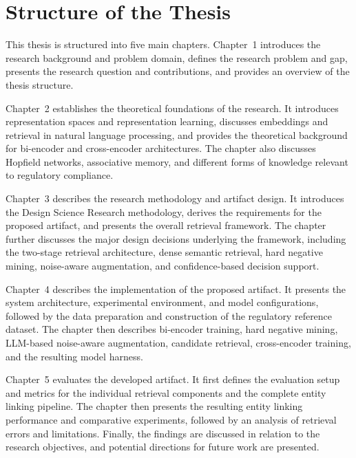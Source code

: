 \section{Structure of the Thesis}

This thesis is structured into five main chapters. Chapter~1 introduces the research background and problem domain, defines the research problem and gap, presents the research question and contributions, and provides an overview of the thesis structure.

Chapter~2 establishes the theoretical foundations of the research. It introduces representation spaces and representation learning, discusses embeddings and retrieval in natural language processing, and provides the theoretical background for bi-encoder and cross-encoder architectures. The chapter also discusses Hopfield networks, associative memory, and different forms of knowledge relevant to regulatory compliance.

Chapter~3 describes the research methodology and artifact design. It introduces the Design Science Research methodology, derives the requirements for the proposed artifact, and presents the overall retrieval framework. The chapter further discusses the major design decisions underlying the framework, including the two-stage retrieval architecture, dense semantic retrieval, hard negative mining, noise-aware augmentation, and confidence-based decision support.

Chapter~4 describes the implementation of the proposed artifact. It presents the system architecture, experimental environment, and model configurations, followed by the data preparation and construction of the regulatory reference dataset. The chapter then describes bi-encoder training, hard negative mining, LLM-based noise-aware augmentation, candidate retrieval, cross-encoder training, and the resulting model harness.

Chapter~5 evaluates the developed artifact. It first defines the evaluation setup and metrics for the individual retrieval components and the complete entity linking pipeline. The chapter then presents the resulting entity linking performance and comparative experiments, followed by an analysis of retrieval errors and limitations. Finally, the findings are discussed in relation to the research objectives, and potential directions for future work are presented.

